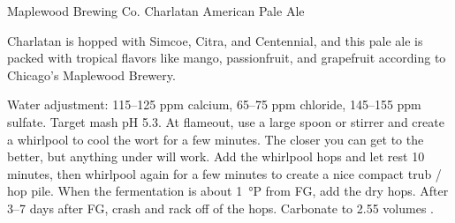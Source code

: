 \begin{recipie}{Maplewood Brewing Co. Charlatan American Pale Ale}

\begin{aboutblock}
Charlatan is hopped with Simcoe, Citra, and Centennial, and this pale ale is packed with
tropical flavors like mango, passionfruit, and grapefruit according to Chicago's Maplewood
Brewery.
\end{aboutblock}


\begin{methodandtiming}
 
\begin{mashsteps}
\end{mashsteps}

\begin{directions}
Water adjustment: 115--125 ppm calcium, 65--75 ppm chloride, 145--155 ppm sulfate.
Target mash pH 5.3. At flameout, use a large spoon or stirrer and create a whirlpool
to cool the wort for a few minutes. The closer you can get to  the better,
but anything under  will work. Add the whirlpool hops and let rest 10
minutes, then whirlpool again for a few minutes to create a nice compact trub / hop
pile. When the fermentation is about 1~°P from FG, add the dry hops. After 3--7 days
after FG, crash and rack off of the hops. Carbonate to 2.55 volumes .
\end{directions}

\end{methodandtiming}

\begin{ingredientsblock}

\begin{malts}
\end{malts}

\begin{hops}
\end{hops}

\begin{yeasts}
\end{yeasts}

\end{ingredientsblock}

\end{recipie}